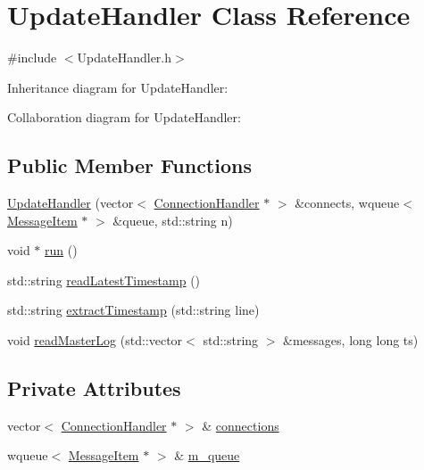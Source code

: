 \hypertarget{classUpdateHandler}{\section{Update\+Handler Class Reference}
\label{classUpdateHandler}
}


{\ttfamily \#include $<$Update\+Handler.\+h$>$}



Inheritance diagram for Update\+Handler\+:


Collaboration diagram for Update\+Handler\+:
\subsection*{Public Member Functions}
\begin{DoxyCompactItemize}
\item 
\hyperlink{classUpdateHandler_a8ab9b932ab95bb52c88437af1491b5eb}{Update\+Handler} (vector$<$ \hyperlink{classConnectionHandler}{Connection\+Handler} $\ast$ $>$ \&connects, wqueue$<$ \hyperlink{classMessageItem}{Message\+Item} $\ast$ $>$ \&queue, std\+::string n)
\item 
void $\ast$ \hyperlink{classUpdateHandler_aa0aa16bb0353144c6e2dd52eab790e79}{run} ()
\item 
std\+::string \hyperlink{classUpdateHandler_a0708510f6f6e5daa92b84ea980bdaee1}{read\+Latest\+Timestamp} ()
\item 
std\+::string \hyperlink{classUpdateHandler_a983a1cb7ba44603c7fca3a7fa58db0f0}{extract\+Timestamp} (std\+::string line)
\item 
void \hyperlink{classUpdateHandler_ae6db94c562dd48286b7ef58bce21fab9}{read\+Master\+Log} (std\+::vector$<$ std\+::string $>$ \&messages, long long ts)
\end{DoxyCompactItemize}
\subsection*{Private Attributes}
\begin{DoxyCompactItemize}
\item 
vector$<$ \hyperlink{classConnectionHandler}{Connection\+Handler} $\ast$ $>$ \& \hyperlink{classUpdateHandler_ab4f5771a111b3b4e6db86d0a2d4e6a93}{connections}
\item 
wqueue$<$ \hyperlink{classMessageItem}{Message\+Item} $\ast$ $>$ \& \hyperlink{classUpdateHandler_afb526d3bf849163a7028fc0759f3b2e6}{m\+\_\+queue}
\end{DoxyCompactItemize}


